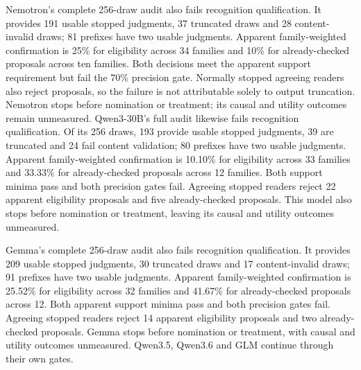Nemotron's complete 256-draw audit also fails recognition qualification.
It provides 191 usable stopped judgments, 37 truncated draws and 28
content-invalid draws; 81 prefixes have two usable judgments. Apparent
family-weighted confirmation is 25\% for eligibility across 34 families
and 10\% for already-checked proposals across ten families. Both decisions
meet the apparent support requirement but fail the 70\% precision gate.
Normally stopped agreeing readers also reject proposals, so the failure
is not attributable solely to output truncation. Nemotron stops before
nomination or treatment; its causal and utility outcomes remain unmeasured.
Qwen3-30B's full audit likewise fails recognition qualification. Of its
256 draws, 193 provide usable stopped judgments, 39 are truncated and 24
fail content validation; 80 prefixes have two usable judgments. Apparent
family-weighted confirmation is 10.10\% for eligibility across 33 families
and 33.33\% for already-checked proposals across 12 families. Both support
minima pass and both precision gates fail. Agreeing stopped readers reject
22 apparent eligibility proposals and five already-checked proposals.
This model also stops before nomination or treatment, leaving its causal
and utility outcomes unmeasured.

Gemma's complete 256-draw audit also fails recognition qualification.
It provides 209 usable stopped judgments, 30 truncated draws and 17
content-invalid draws; 91 prefixes have two usable judgments. Apparent
family-weighted confirmation is 25.52\% for eligibility across 32 families
and 41.67\% for already-checked proposals across 12. Both apparent support
minima pass and both precision gates fail. Agreeing stopped readers reject
14 apparent eligibility proposals and two already-checked proposals.
Gemma stops before nomination or treatment, with causal and utility outcomes
unmeasured. Qwen3.5, Qwen3.6 and GLM continue through their own gates.

